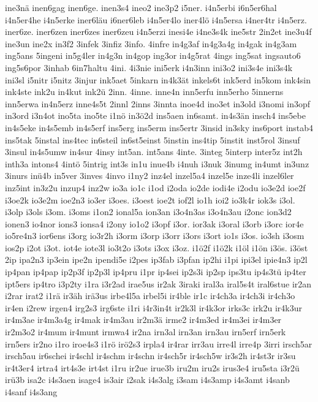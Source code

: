 {ine3nä
inen6gag
inen6ge.
inen3s4
ineo2
ine3p2
i5ner.
i4n5erbi
i6n5er6hal
i4n5er4he
i4n5erke
iner6läu
i6ner6leb
i4n5er4lo
iner4lö
i4n5ersa
i4ner4tr
i4n5erz.
iner6ze.
iner6zen
iner6zes
iner6zeu
i4n5erzi
inesi4e
i4ne3s4k
ine5str
2in2et
ine3u4f
ine3un
ine2x
in3f2
3infek
3infiz
3info.
4infre
in4g3af
in4g3a4g
in4gak
in4g3am
ing5ans
5ingeni
in5g4ler
in4g3n
in4gop
ing3or
in4g5rat
4ings
ing5sat
ingsauto6
ing5s6por
3inhab
6in7haltu
4ini.
4i3nie
ini5erk
i4n3inn
ini3o2
ini3s4e
ini3s4k
ini3sl
i5nitr
i5nitz
3injur
ink5aet
5inkarn
in4k3ät
inkels6t
ink5erd
in5kom
ink4sin
ink4ste
ink2u
in4kut
ink2ü
2inn.
4inne.
inne4n
inn5erfu
inn5erho
5innerns
inn5erwa
in4n5erz
inne4s5t
2innl
2inns
3innta
inoe4d
ino3et
in3old
i3nomi
in3opf
in3ord
i3n4ot
ino5ta
ino5te
i1nö
in3ö2d
ins5aen
in6samt.
in4s3än
insch4
ins5ebe
in4s5eke
in4s5emb
in4s5erf
ins5erg
ins5erm
ins5ertr
3insid
in3sky
ins6port
instab4
ins5tak
5instal
ins4tec
in6steil
in6st5einst
5instin
ins4tip
5instit
inst5rol
3insuf
3insul
in4s5umw
in4sur
4insy
int5an.
int5ans
4inte.
3integ
5interp
inter5z
int2h
inth3a
intons4
4intö
5intrig
int3s
in1u
inue4b
i4nuh
i3nuk
3inumg
in4umt
in3unz
3inurs
inü4b
in5ver
3inves
4invo
i1ny2
inz4el
inzel5a4
inzel5e
inze4li
inzel6ler
inz5int
in3z2u
inzup4
inz2w
io3a
io1c
i1od
i2oda
io2de
iodi4e
i2odu
io3e2d
ioe2f
i3oe2k
io3e2m
ioe2n3
io3er
i3oes.
i3oest
ioe2t
iof2l
io1h
ioi2
io3k4r
iok3s
i3ol.
i3olp
i3ols
i3om.
i3oms
i1on2
ional5a
ion3an
i3o4n3as
i3o4n3au
i2onc
ion3d2
ionen3
io4nor
ions3
ionsa4
i2ony
io1o2
i3opf
i3or.
ior3ak
i3oral
i3orb
i3orc
ior4e
io5re4n3
ior6ens
i3org
io3r2h
i3orm
i3orp
i3orr
i3ors
i3ort
io1s
i3os.
io3sh
i3osm
ios2p
i2ot
i3ot.
iot4e
iote3l
io3t2o
i3ots
i3ox
i3oz.
i1ö2f
i1ö2k
i1öl
i1ön
i3ös.
i3öst
2ip
ipa2n3
ip3ein
ipe2n
ipendi5e
i2pes
ip3fab
i3pfan
ip2hi
i1pi
ipi3el
ipie4n3
ip2l
ip4pan
ip4pap
ip2p3f
ip2p3l
ip4pru
i1pr
ip4sei
ip2s3i
ip2sp
ips3tu
ip4s3tü
ip4ter
ipt5ers
ip4tro
i3p2ty
i1ra
i3r2ad
irae5us
ir2ak
3iraki
iral3a
iral5s4t
iral6stue
ir2an
i2rar
irat2
i1rä
ir3äh
irä3us
irbe4l5a
irbel5i
ir4ble
ir1c
ir4ch3a
ir4ch3i
ir4ch3o
ir4en
i2rew
irgen4
irg2s3
irg6ste
i1ri
i4r3in4t
ir2k3l
ir4k3or
irks3c
irk2u
ir4k3ur
ir4m3ae
ir4m3a4g
ir4mak
ir4m3au
ir2m3ä
irme2
ir4m3ed
ir4m3ei
ir4m3er
ir2m3o2
ir4mum
ir4munt
irmwa4
ir2na
irn3al
irn3an
irn3au
irn5erf
irn5erk
irn5ers
ir2no
i1ro
iroe4s3
i1rö
irö2s3
irpla4
ir4rar
irr3au
irre4l
irre4p
3irri
irsch5ar
irsch5au
ir6schei
ir4schl
ir4schm
ir4schn
ir4sch5r
ir4sch5w
ir3s2h
ir4st3r
ir3su
ir4t3er4
irtra4
irt4s3e
irt4st
i1ru
ir2ue
irue3b
iru2m
iru2s
irus3e4
iru5sta
i3r2ü
irü3b
isa2c
i4s3aen
isage4
is3air
i2sak
i4s3alg
i3sam
i4s3amp
i4s3amt
i4sanb
i4sanf
i4s3ang
}
